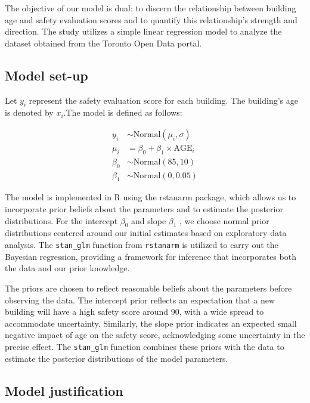 \documentclass[
  letterpaper,
  DIV=11,
  numbers=noendperiod]{scrartcl}
\begin{document}
The objective of our model is dual: to discern the relationship between
building age and safety evaluation scores and to quantify this
relationship's strength and direction. The study utilizes a simple
linear regression model to analyze the dataset obtained from the Toronto
Open Data portal.

\hypertarget{model-set-up}{%
\subsection{Model set-up}\label{model-set-up}}

Let \(y_i\) represent the safety evaluation score for each building. The
building's age is denoted by \(x_i\).The model is defined as follows:

\begin{align}
y_i &\sim \mbox{Normal}(\mu_i, \sigma) \\
\mu_i &= \beta_0 + \beta_1 \times \mbox{AGE}_i \\
\beta_0 &\sim \mbox{Normal}(85, 10) \\
\beta_1 &\sim \mbox{Normal}(0, 0.05)
\end{align}

The model is implemented in R using the rstanarm package, which allows
us to incorporate prior beliefs about the parameters and to estimate the
posterior distributions. For the intercept \(\beta_0\) and slope
\(\beta_1\) , we choose normal prior distributions centered around our
initial estimates based on exploratory data analysis. The
\texttt{stan\_glm} function from \texttt{rstanarm} is utilized to carry
out the Bayesian regression, providing a framework for inference that
incorporates both the data and our prior knowledge.

The priors are chosen to reflect reasonable beliefs about the parameters
before observing the data. The intercept prior reflects an expectation
that a new building will have a high safety score around 90, with a wide
spread to accommodate uncertainty. Similarly, the slope prior indicates
an expected small negative impact of age on the safety score,
acknowledging some uncertainty in the precise effect. The
\texttt{stan\_glm} function combines these priors with the data to
estimate the posterior distributions of the model parameters.

\hypertarget{model-justification}{%
\subsection{Model justification}\label{model-justification}}
\end{document}
